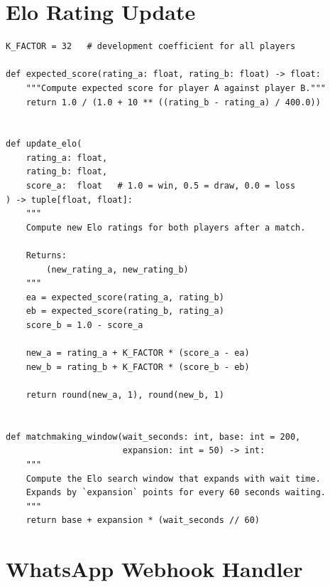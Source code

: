 \section{Elo Rating Update}
\label{app:code-elo}

\begin{lstlisting}[style=pythonstyle, caption={Elo rating calculation and update (social/elo.py).}]
K_FACTOR = 32   # development coefficient for all players

def expected_score(rating_a: float, rating_b: float) -> float:
    """Compute expected score for player A against player B."""
    return 1.0 / (1.0 + 10 ** ((rating_b - rating_a) / 400.0))


def update_elo(
    rating_a: float,
    rating_b: float,
    score_a:  float   # 1.0 = win, 0.5 = draw, 0.0 = loss
) -> tuple[float, float]:
    """
    Compute new Elo ratings for both players after a match.

    Returns:
        (new_rating_a, new_rating_b)
    """
    ea = expected_score(rating_a, rating_b)
    eb = expected_score(rating_b, rating_a)
    score_b = 1.0 - score_a

    new_a = rating_a + K_FACTOR * (score_a - ea)
    new_b = rating_b + K_FACTOR * (score_b - eb)

    return round(new_a, 1), round(new_b, 1)


def matchmaking_window(wait_seconds: int, base: int = 200,
                       expansion: int = 50) -> int:
    """
    Compute the Elo search window that expands with wait time.
    Expands by `expansion` points for every 60 seconds waiting.
    """
    return base + expansion * (wait_seconds // 60)
\end{lstlisting}

\section{WhatsApp Webhook Handler}
\label{app:code-webhook}

